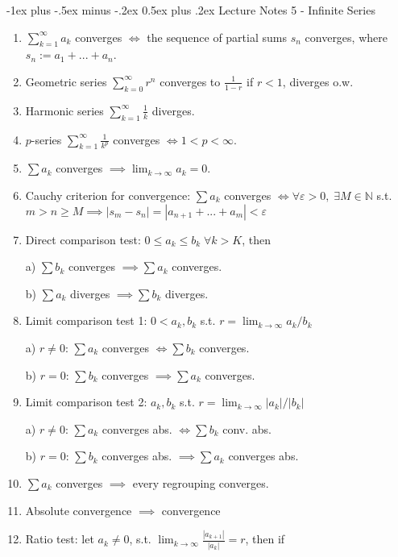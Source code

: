 \documentclass[10pt,landscape]{article}
\makeatletter
\renewcommand{\section}{\@startsection{section}{1}{0mm}%
                                {-1ex plus -.5ex minus -.2ex}%
                                {0.5ex plus .2ex}%
                                {\normalfont\large\bfseries}}
\makeatother
\begin{document}
\begin{multicols}{3}
\begin{enumerate}
\end{enumerate}


\section{Lecture Notes 5 - Infinite Series}
\begin{enumerate}
	\item $\sum^\infty_{k=1} a_k $ converges $\iff$ the sequence of partial sums $s_n$ converges, where $s_n := a_1 + ... + a_n$.
	\item Geometric series $\sum^\infty_{k=0} r^n $ converges to $\frac{1}{1-r}$ if $r<1$, diverges o.w.
	\item Harmonic series $\sum^\infty_{k=1}\frac{1}{k}$ diverges.
	\item $p$-series $\sum^\infty_{k=1}\frac{1}{k^p}$ converges $ \iff 1<p<\infty$.
	\item $\sum a_k$ converges $ \implies \lim_{k\rightarrow \infty} a_k = 0$.
	\item Cauchy criterion for convergence: $\sum a_k$ converges $\iff \forall \varepsilon >0, \; \exists M\in \mathbb{N} $ s.t. $m>n\geq M  \implies |s_m -s_n| = |a_{n+1} + ...+ a_m | < \varepsilon$
	\item Direct comparison test: $0\leq a_k\leq b_k \; \forall k>K$, then
	
	a) $\sum b_k$ converges $\implies \sum a_k$ converges.
	
	b) $\sum a_k$ diverges $\implies \sum b_k$ diverges.
	\item Limit comparison test 1: $0<a_k, b_k $ s.t. $r = \lim_{k\rightarrow \infty} a_k/b_k$
	
	a) $r\neq 0$: $\sum a_k$ converges $\iff \sum b_k$ converges.
	
	b) $r = 0$: $\sum b_k$ converges $\implies \sum a_k$ converges. 
	\item Limit comparison test 2: $a_k, b_k $ s.t. $r = \lim_{k\rightarrow \infty} |a_k|/|b_k|$
	
	a) $r\neq 0$: $\sum a_k$ converges abs. $\iff \sum b_k$ conv. abs.
	
	b) $r = 0$: $\sum b_k$ converges abs. $\implies \sum a_k$ converges abs. 

	
	\item $\sum a_k$ converges $\implies$ every regrouping converges.
	
	\item Absolute convergence $\implies $ convergence
	
	\item Ratio test: let $a_k \neq 0$, s.t. $\lim_{k \rightarrow \infty} \frac{|a_{k+1}|}{ |a_k|} = r $, then if
	

\end{enumerate}
\end{multicols}
\end{document}
